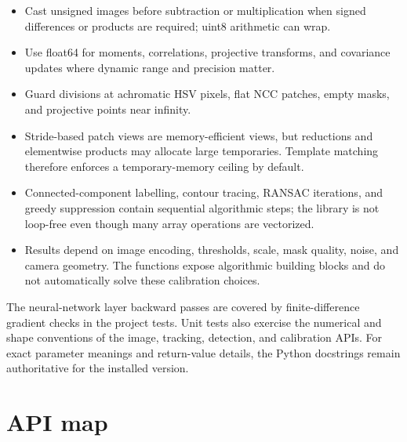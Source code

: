 \documentclass[11pt,a4paper]{article}
\newcommand{\1}{\mathbf{1}}
\begin{document}
\begin{itemize}
  \item Cast unsigned images before subtraction or multiplication when signed
        differences or products are required; uint8 arithmetic can wrap.
  \item Use float64 for moments, correlations, projective transforms, and
        covariance updates where dynamic range and precision matter.
  \item Guard divisions at achromatic HSV pixels, flat NCC patches, empty
        masks, and projective points near infinity.
  \item Stride-based patch views are memory-efficient views, but reductions and
        elementwise products may allocate large temporaries. Template matching
        therefore enforces a temporary-memory ceiling by default.
  \item Connected-component labelling, contour tracing, RANSAC iterations,
        and greedy suppression contain sequential algorithmic steps; the
        library is not loop-free even though many array operations are vectorized.
  \item Results depend on image encoding, thresholds, scale, mask quality,
        noise, and camera geometry. The functions expose algorithmic building
        blocks and do not automatically solve these calibration choices.
\end{itemize}

The neural-network layer backward passes are covered by finite-difference
gradient checks in the project tests. Unit tests also exercise the numerical
and shape conventions of the image, tracking, detection, and calibration APIs.
For exact parameter meanings and return-value details, the Python docstrings
remain authoritative for the installed version.

\section{API map}
\end{document}

